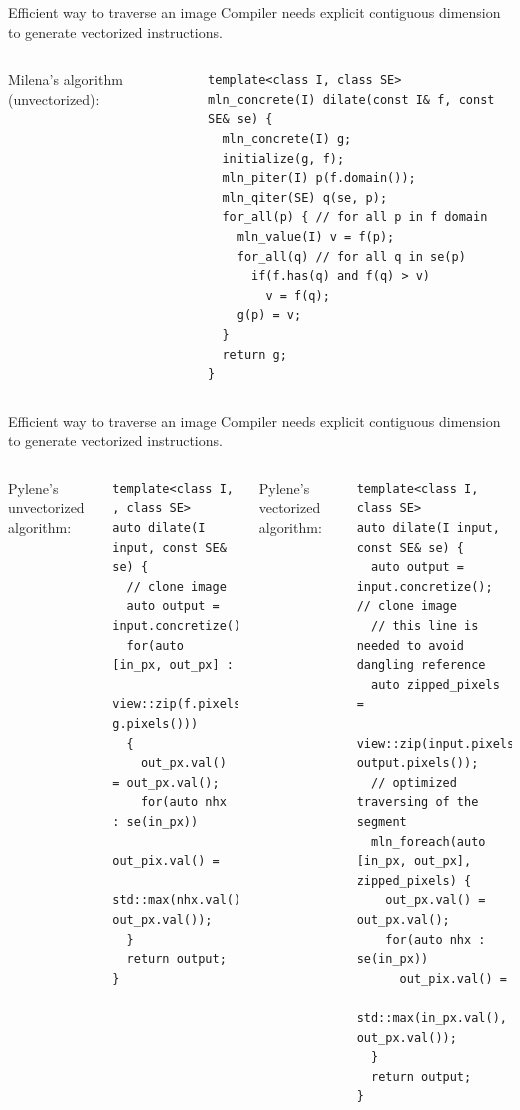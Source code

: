 \documentclass[12pt,aspectratio=169]{beamer}
\begin{document}
\begin{frame}[fragile]{Efficient way to traverse an image}
  Compiler needs explicit contiguous dimension to generate vectorized instructions.
  \begin{columns}[T,onlytextwidth]
    Milena's algorithm (unvectorized):
    \begin{verbatim}
template<class I, class SE>
mln_concrete(I) dilate(const I& f, const SE& se) {
  mln_concrete(I) g;
  initialize(g, f);
  mln_piter(I) p(f.domain());
  mln_qiter(SE) q(se, p);
  for_all(p) { // for all p in f domain
    mln_value(I) v = f(p);
    for_all(q) // for all q in se(p)
      if(f.has(q) and f(q) > v)
        v = f(q);
    g(p) = v;
  }
  return g;
}
    \end{verbatim}

  \end{columns}
\end{frame}

\begin{frame}[fragile]{Efficient way to traverse an image}
  Compiler needs explicit contiguous dimension to generate vectorized instructions.
  \begin{columns}[T,onlytextwidth]
    Pylene's unvectorized algorithm:
    \begin{verbatim}
template<class I, , class SE>
auto dilate(I input, const SE& se) {
  // clone image
  auto output = input.concretize();
  for(auto [in_px, out_px] :
        view::zip(f.pixels(), g.pixels()))
  {
    out_px.val() = out_px.val();
    for(auto nhx : se(in_px))
      out_pix.val() =
        std::max(nhx.val(), out_px.val());
  }
  return output;
}
    \end{verbatim}
    Pylene's vectorized algorithm:
    \begin{verbatim}
template<class I, class SE>
auto dilate(I input, const SE& se) {
  auto output = input.concretize(); // clone image
  // this line is needed to avoid dangling reference
  auto zipped_pixels =
        view::zip(input.pixels(), output.pixels());
  // optimized traversing of the segment
  mln_foreach(auto [in_px, out_px], zipped_pixels) {
    out_px.val() = out_px.val();
    for(auto nhx : se(in_px))
      out_pix.val() =
        std::max(in_px.val(), out_px.val());
  }
  return output;
}
    \end{verbatim}
  \end{columns}
\end{frame}
\end{document}
